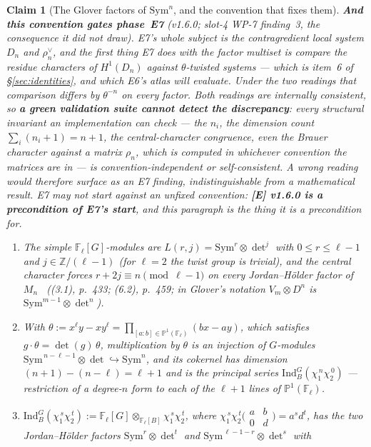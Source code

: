 \documentclass[11pt]{article}
\newtheorem{claim}[theorem]{Claim}
\theoremstyle{remark}
\newcommand{\F}{\mathbb{F}}
\newcommand{\Z}{\mathbb{Z}}
\newcommand{\Sym}{\mathrm{Sym}}
\newcommand{\Fl}{\F_\ell}
\newcommand{\Mn}{M_n}
\newcommand{\Dn}{D_n}
\begin{document}
\begin{claim}[The Glover factors of $\Sym^n$, and the convention that fixes them]
\textbf{And this convention \emph{gates} phase~E7} (v1.6.0; slot-4 WP-7 finding~3, the
consequence it did not draw). E7's whole subject is the contragredient local system $\Dn$ and
$\rho_n^{\vee}$, and the first thing E7 does with the factor multiset is compare the residue
characters of $H^1(\Dn)$ against $\theta$-twisted systems --- which is item~6 of
\S\ref{sec:identities}, and which E6's atlas will evaluate. Under the two readings that
comparison differs by $\theta^{-n}$ on \emph{every} factor. Both readings are internally
consistent, so \textbf{a green validation suite cannot detect the discrepancy}: every
structural invariant an implementation can check --- the $n_i$, the dimension count
$\sum_i(n_i+1)=n+1$, the central-character congruence, even the Brauer character against a
matrix $\rho_n$, which is computed in whichever convention the matrices are in --- is
convention-independent or self-consistent. A wrong reading would therefore surface as an E7
\emph{finding}, indistinguishable from a mathematical result. E7 may not start against an
unfixed convention: \textbf{[E] v1.6.0 is a precondition of E7's start}, and this paragraph
is the thing it is a precondition for.
\begin{enumerate}
\item The simple $\Fl[G]$-modules are $L(r,j)=\Sym^{r}\otimes\det^{j}$ with
  $0\le r\le\ell-1$ and $j\in\Z/(\ell-1)$ (for $\ell=2$ the twist group is trivial), and
  the central character forces $r+2j\equiv n\pmod{\ell-1}$ on every Jordan--H\"older factor
  of $\Mn$~\cite{glover} ((3.1), p.~433; (6.2), p.~459; in Glover's notation $V_m\otimes D^{n}$ is $\Sym^{m-1}\otimes\det^{n}$).
\item With $\theta:=x^{\ell}y-xy^{\ell}=\prod_{[a:b]\in\mathbb{P}^{1}(\Fl)}(bx-ay)$, which
  satisfies $g\cdot\theta=\det(g)\,\theta$, multiplication by $\theta$ is an injection of
  $G$-modules $\Sym^{\,n-\ell-1}\otimes\det\hookrightarrow\Sym^{n}$, and its cokernel has
  dimension $(n+1)-(n-\ell)=\ell+1$ and is the principal series
  $\mathrm{Ind}_B^G(\chi_1^{\,n}\chi_2^{\,0})$ --- restriction of a degree-$n$ form to each
  of the $\ell+1$ lines of $\mathbb{P}^{1}(\Fl)$.
\item $\mathrm{Ind}_B^G(\chi_1^{\,s}\chi_2^{\,t}):=\Fl[G]\otimes_{\Fl[B]}\chi_1^{\,s}\chi_2^{\,t}$, where
  $\chi_1^{\,s}\chi_2^{\,t}\bigl(\begin{smallmatrix}a&b\\0&d\end{smallmatrix}\bigr)=a^{s}d^{t}$, has the two Jordan--H\"older factors
  $\Sym^{r}\otimes\det^{t}$ and $\Sym^{\,\ell-1-r}\otimes\det^{s}$ with

\end{enumerate}
\end{claim}
\end{document}
